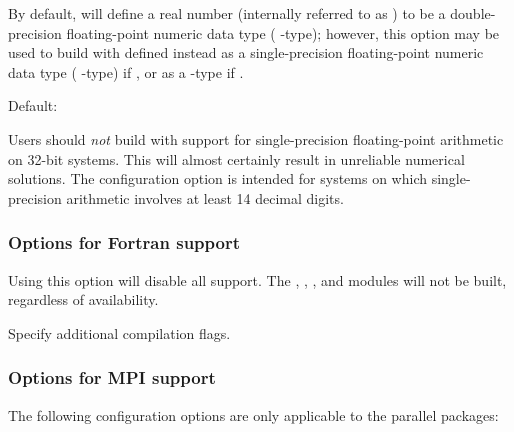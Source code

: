 \begin{config}
\item {}

  By default, {\sundials} will define a real number (internally referred to as
  ) to be a double-precision floating-point numeric data type
  ( {\C}-type); however, this option may be used to build {\sundials}
  with  defined instead as a single-precision floating-point
  numeric data type ( {\C}-type) if , or as a
   {\C}-type if .

  Default: 

  {\warn}Users should {\em not} build {\sundials} with support for
  single-precision floating-point arithmetic on 32-bit systems.
  This will almost certainly result in unreliable numerical solutions.
  The configuration option  is intended for
  systems on which single-precision arithmetic involves at least 14 decimal
  digits.

\end{config}


\subsubsection*{Options for Fortran support}

\begin{config}

\item {}

  Using this option will disable all {\F} support. The {\fcvode},
  {\fkinsol}, {\fida}, and {\fnvector} modules will not be built,
  regardless of availability.

\item {}

  Specify additional {\F} compilation flags.

\end{config}



\subsubsection*{Options for MPI support}

\noindent The following configuration options are only applicable to the parallel
{\sundials} packages:

